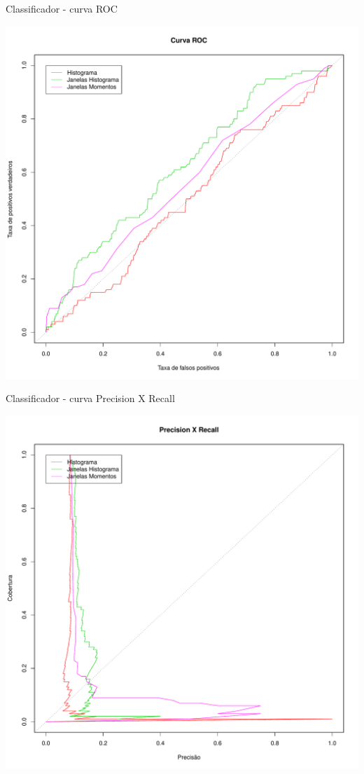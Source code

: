 \documentclass[
    style=paintings,
    paper=screen,
    blackslide,
    nopagebreaks,
    fleqn
]{powerdot}
\begin{document}
\begin{slide}{Classificador - curva ROC}
\begin{center}
\includegraphics[width=0.6\slidewidth]{img/curvaroc}
\end{center}
\end{slide}


\begin{slide}{Classificador - curva Precision X Recall}
\begin{center} 
\includegraphics[width=0.6\slidewidth]{img/precision_recall}
\end{center}
\end{slide}
\end{document}
